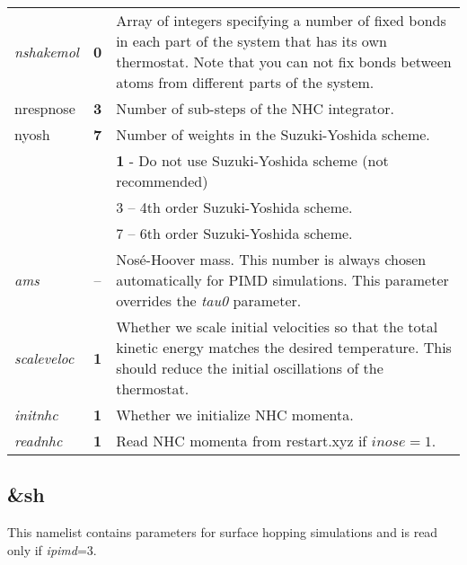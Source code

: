\begin{tabularx}{\textwidth}{lcX}
\textit{nshakemol} & \textbf{0} & Array of integers specifying a number of fixed bonds in each part of the system that has its own thermostat.
Note that you can not fix bonds between atoms from different parts of the system. \\

\colorbox{black!20}{nrespnose} & \textbf{3} & Number of sub-steps of the NHC integrator.\cite{Tuckerman_book} \\

\colorbox{black!20}{nyosh} & \textbf{7} & Number of weights in the Suzuki-Yoshida scheme.\cite{Tuckerman_book} \\
& & \textbf{1} - Do not use Suzuki-Yoshida scheme (not recommended) \\
& & 3 -- 4th order Suzuki-Yoshida scheme.\\
& & 7 -- 6th order Suzuki-Yoshida scheme.\\  

\colorbox{black!20}{\textit{ams}} & -- &  Nos\'{e}-Hoover mass.
This number is always chosen automatically for PIMD simulations.
This parameter overrides the \textit{tau0} parameter. \\

\colorbox{black!20}{\textit{scaleveloc}} & \textbf{1} & Whether we scale initial velocities so that the total kinetic energy
matches the desired temperature. This should reduce the initial oscillations of the thermostat. \\ 

\colorbox{black!20}{\textit{initnhc}} & \textbf{1} & Whether we initialize NHC momenta. \\ 

\colorbox{black!20}{\textit{readnhc}} & \textbf{1} & Read NHC momenta from restart.xyz if $inose=1$. \\ 

\end{tabularx}


\newpage
\subsection{\&sh}
This namelist contains parameters for surface hopping simulations and is read only if \textit{ipimd}=3.
 
